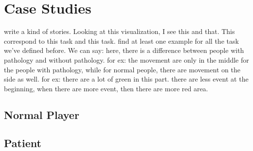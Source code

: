 \chapter{Case Studies}
write a kind of stories. Looking at this visualization, I see this and that. This correspond to this task and this task.
find at least one example for all the task we've defined before. We can say: here, there is a difference between people with pathology and without pathology.
for ex: the movement are only in the middle for the people with pathology, while for normal people, there are movement on the side as well.
for ex: there are a lot of green in this part. there are less event at the beginning, when there are more event, then there are more red area.
\section{Normal Player}
\section{Patient}